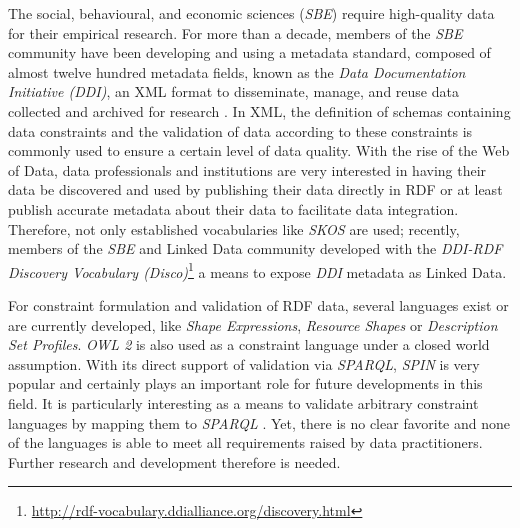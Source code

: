 \documentclass{llncs}
\begin{document}

The social, behavioural, and economic sciences (\emph{SBE}) require high-quality data for their empirical research. For more than a decade, members of the \emph{SBE} community have been developing and using a
metadata standard, composed of almost twelve hundred metadata fields, known as the \emph{Data Documentation Initiative (DDI)},
an XML format to disseminate, manage,
and reuse data collected and archived for research \cite{Vardigan2008}. 
In XML, the definition of schemas containing data constraints and the validation of data according to these constraints is commonly used to ensure a certain level of data quality.
With the rise of the Web of Data, data professionals and institutions are very interested in having their data be discovered and used by publishing their data directly in RDF or at least publish accurate metadata about their data to facilitate data integration. Therefore, not only established vocabularies like \emph{SKOS} are used; 
recently, members of the \emph{SBE} and Linked Data community developed with the \emph{DDI-RDF Discovery Vocabulary (Disco)}\footnote{\url{http://rdf-vocabulary.ddialliance.org/discovery.html}} a means to expose \emph{DDI} metadata as Linked Data. 

For constraint formulation and validation of RDF data, several languages exist or are currently developed, like \emph{Shape Expressions}, \emph{Resource Shapes} or \emph{Description Set Profiles}. \emph{OWL 2} is also used as a constraint language under a closed world assumption. With its direct support of validation via \emph{SPARQL}, \emph{SPIN}%
is very popular and certainly plays an important role for future developments in this field. It is particularly interesting as a means to validate arbitrary constraint languages by mapping them to \emph{SPARQL} \cite{BoschEckert2014-2}. Yet, there is no clear favorite and none of the languages is able to meet all requirements raised by data practitioners. Further research and development therefore is needed.
\end{document}
